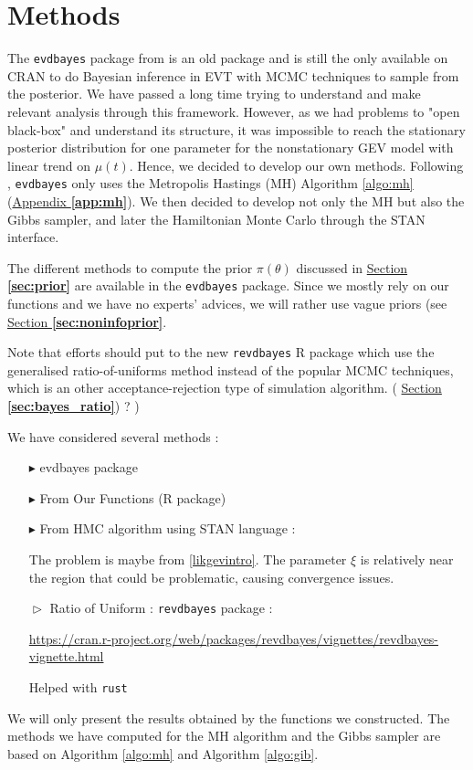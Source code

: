 \section{Methods }

The \texttt{evdbayes} package from \citet{ribatet_users_2006} is an old package and is still the only available on CRAN to do Bayesian inference in EVT with MCMC techniques to sample from the posterior. We have passed a long time trying to understand and make relevant analysis through this framework. However, as we had problems to "open black-box" and understand its structure, it was impossible to reach the stationary posterior distribution for one parameter for the nonstationary GEV model with linear trend on $\mu(t)$. Hence, we decided to develop our own methods. Following \citet{hartmann_bayesian_2016}, \texttt{evdbayes} only uses the Metropolis Hastings (MH) Algorithm \ref{algo:mh} (\hyperref[app:mh]{Appendix \textbf{\ref{app:mh}}}). We then decided to develop not only the MH but also the Gibbs sampler, and later the Hamiltonian Monte Carlo through the STAN interface. 

The different methods to compute the prior $\pi(\theta)$ discussed in \hyperref[sec:prior]{Section \textbf{\ref{sec:prior}}} are available in the \texttt{evdbayes} package. Since we mostly rely on our functions and we have no experts' advices, we will rather use vague priors (see \hyperref[sec:noninfoprior]{Section \textbf{\ref{sec:noninfoprior}}}. 


 Note that efforts should put to the new \texttt{revdbayes} R package which use the generalised ratio-of-uniforms method instead of the popular MCMC techniques, which is an other acceptance-rejection type of simulation algorithm. ( \hyperref[sec:bayes_ratio]{Section \textbf{\ref{sec:bayes_ratio}}}) ? )
 
 
 
 We have considered several methods : 
 
 \begin{itemize}
 	\item[$\blacktriangleright$] evdbayes package
 	\item[$\blacktriangleright$] From Our Functions (R package)
 	
 	\item[$\blacktriangleright$] From HMC algorithm using STAN language :
 	
 	The problem is maybe from \ref{likgevintro}. The parameter $\xi$ is relatively near the region that could be problematic, causing convergence issues. 
 	
 	 	\item[$\vartriangleright$] Ratio of Uniform : \texttt{revdbayes} package :
 	 	
 	 	\url{https://cran.r-project.org/web/packages/revdbayes/vignettes/revdbayes-vignette.html}
 	 	
 	 	Helped with \texttt{rust}
 \end{itemize}
We will only present the results obtained by the functions we constructed. The methods we have computed for the MH algorithm and the Gibbs sampler are based on Algorithm \ref{algo:mh} and Algorithm \ref{algo:gib}.

